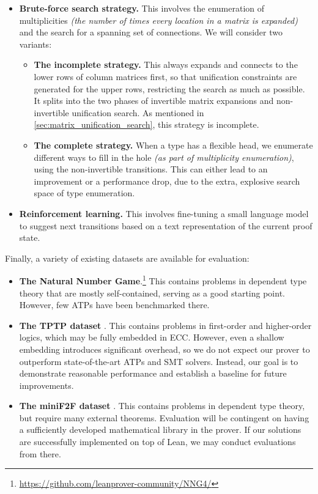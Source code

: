 \documentclass[twoside]{report}
\begin{document}
\begin{itemize}
    \item \textbf{Brute-force search strategy.} This involves the enumeration of multiplicities \emph{(the number of times every location in a matrix is expanded)} and the search for a spanning set of connections. We will consider two variants:
    \begin{itemize}
        \item \textbf{The incomplete strategy.} This always expands and connects to the lower rows of column matrices first, so that unification constraints are generated for the upper rows, restricting the search as much as possible. It splits into the two phases of invertible matrix expansions and non-invertible unification search. As mentioned in \cref{sec:matrix_unification_search}, this strategy is incomplete.

        \item \textbf{The complete strategy.} When a type has a flexible head, we enumerate different ways to fill in the hole \emph{(as part of multiplicity enumeration)}, using the non-invertible transitions. This can either lead to an improvement or a performance drop, due to the extra, explosive search space of type enumeration.
    \end{itemize}

    \item \textbf{Reinforcement learning.} This involves fine-tuning a small language model to suggest next transitions based on a text representation of the current proof state.
\end{itemize}

Finally, a variety of existing datasets are available for evaluation:

\begin{itemize}
    \item \textbf{The Natural Number Game}.\footnote{\url{https://github.com/leanprover-community/NNG4/}} This contains problems in dependent type theory that are mostly self-contained, serving as a good starting point. However, few ATPs have been benchmarked there.

    \item \textbf{The TPTP dataset} \cite{sut17tptp}. This contains problems in first-order and higher-order logics, which may be fully embedded in ECC. However, even a shallow embedding introduces significant overhead, so we do not expect our prover to outperform state-of-the-art ATPs and SMT solvers. Instead, our goal is to demonstrate reasonable performance and establish a baseline for future improvements.

    \item \textbf{The miniF2F dataset} \cite{zheng2021minif2f}. This contains problems in dependent type theory, but require many external theorems. Evaluation will be contingent on having a sufficiently developed mathematical library in the prover. If our solutions are successfully implemented on top of Lean, we may conduct evaluations from there.
\end{itemize}
\end{document}

